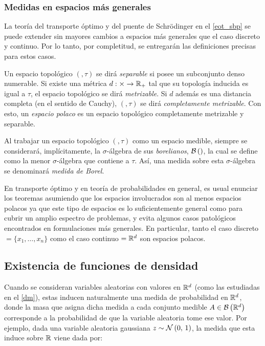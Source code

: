 \subsubsection{Medidas en espacios más generales}

La teoría del transporte óptimo y del puente de Schrödinger en el \autoref{eot_sbp} se puede extender sin mayores cambios a espacios más generales que el caso discreto y continuo. Por lo tanto, por completitud, se entregarán las definiciones precisas para estos casos.

Un espacio topológico $(\xspace,\tau)$ se dirá \textit{separable} si posee un subconjunto denso numerable. Si existe una métrica $d:\times\to\mathbb{R}_+$ tal que su topología inducida es igual a $\tau$, el espacio topológico se dirá \textit{metrizable}. Si $d$ además es una distancia completa (en el sentido de Cauchy), $(\xspace,\tau)$ se dirá \textit{completamente metrizable}. Con esto, un \textit{espacio polaco} es un espacio topológico completamente metrizable y separable.

Al trabajar un espacio topológico $(\xspace,\tau)$ como un espacio medible, siempre se considerará, implícitamente, la $\sigma$-álgebra de sus \textit{borelianos}, $\mathcal{B}\left(\right)$, la cual se define como la menor $\sigma$-álgebra que contiene a $\tau$. Así, una medida sobre esta $\sigma$-álgebra se denominará \textit{medida de Borel}.

En transporte óptimo y en teoría de probabilidades en general, es usual enunciar los teoremas asumiendo que los espacios involucrados son al menos espacios polacos ya que este tipo de espacios es lo suficientemente general como para cubrir un amplio espectro de problemas, y evita algunos casos patológicos encontrados en formulaciones más generales. En particular, tanto el caso discreto $\xspace=\{x_1,\ldots,x_n\}$ como el caso continuo $=\mathbb{R}^d$ son espacios polacos.

\subsection{Existencia de funciones de densidad}
\label{ot/measure_theory/density}

Cuando se consideran variables aleatorias con valores en $\mathbb{R}^d$ (como las estudiadas en el \autoref{dm}), estas inducen naturalmente una medida de probabilidad en $\mathbb{R}^d$, donde la masa que asigna dicha medida a cada conjunto medible $A\in\mathcal{B}\left(\mathbb{R}^d\right)$ corresponde a la probabilidad de que la variable aleatoria tome ese valor. Por ejemplo, dada una variable aleatoria gaussiana $z\sim\mathcal{N}\left(0,\,1\right)$, la medida que esta induce sobre $\mathbb{R}$ viene dada por:

